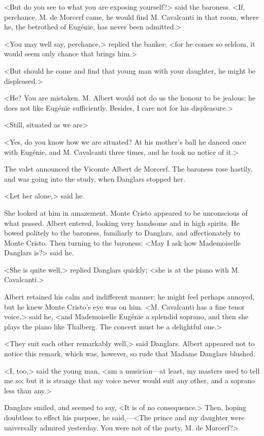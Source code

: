  <But do you see to what you are exposing yourself?> said the baroness. <If, perchance, M. de Morcerf came, he would find M. Cavalcanti in that room, where he, the betrothed of Eugénie, has never been admitted.> 

 <You may well say, perchance,> replied the banker; <for he comes so seldom, it would seem only chance that brings him.> 

 <But should he come and find that young man with your daughter, he might be displeased.> 

 <He? You are mistaken. M. Albert would not do us the honour to be jealous; he does not like Eugénie sufficiently. Besides, I care not for his displeasure.> 

 <Still, situated as we are\longdash> 

 <Yes, do you know how we are situated? At his mother's ball he danced once with Eugénie, and M. Cavalcanti three times, and he took no notice of it.> 

 The valet announced the Vicomte Albert de Morcerf. The baroness rose hastily, and was going into the study, when Danglars stopped her. 

 <Let her alone,> said he. 

 She looked at him in amazement. Monte Cristo appeared to be unconscious of what passed. Albert entered, looking very handsome and in high spirits. He bowed politely to the baroness, familiarly to Danglars, and affectionately to Monte Cristo. Then turning to the baroness: <May I ask how Mademoiselle Danglars is?> said he. 

 <She is quite well,> replied Danglars quickly; <she is at the piano with M. Cavalcanti.> 

 Albert retained his calm and indifferent manner; he might feel perhaps annoyed, but he knew Monte Cristo's eye was on him. <M. Cavalcanti has a fine tenor voice,> said he, <and Mademoiselle Eugénie a splendid soprano, and then she plays the piano like Thalberg. The concert must be a delightful one.> 

 <They suit each other remarkably well,> said Danglars. Albert appeared not to notice this remark, which was, however, so rude that Madame Danglars blushed. 

 <I, too,> said the young man, <am a musician—at least, my masters used to tell me so; but it is strange that my voice never would suit any other, and a soprano less than any.> 

 Danglars smiled, and seemed to say, <It is of no consequence.> Then, hoping doubtless to effect his purpose, he said,—<The prince and my daughter were universally admired yesterday. You were not of the party, M. de Morcerf?> 

